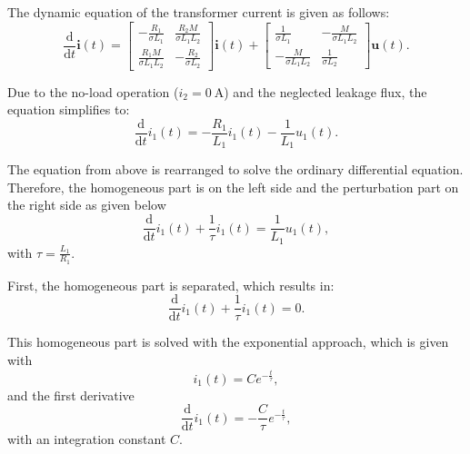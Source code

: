 \begin{solutionblock}
  
  The dynamic equation of the transformer current is given as follows:
  \begin{equation}
    \frac{\mathrm{d}}{\mathrm{d}t}\bm{i}(t) = \begin{bmatrix} -\frac{R_1}{\sigma L_1} & \frac{R_2 M}{\sigma L_1 L_2} \\ \frac{R_1 M}{\sigma L_1 L_2} & -\frac{R_2}{\sigma L_2} \end{bmatrix} \bm{i}(t) + \begin{bmatrix} \frac{1}{\sigma L_1} & -\frac{M}{\sigma L_1 L_2} \\ -\frac{M}{\sigma L_1 L_2} & \frac{1}{\sigma L_2} \end{bmatrix} \bm{u}(t).
  \end{equation}

  Due to the no-load operation ($i_{\mathrm{2}} = \SI{0}{\ampere}$) and the neglected leakage flux, the equation simplifies to:
  \begin{equation}
    \frac{\mathrm{d}}{\mathrm{d}t} i_{\mathrm{1}}(t) = -\frac{R_{\mathrm{1}}}{L_{\mathrm{1}}}i_{\mathrm{1}}(t) -\frac{1}{L_{\mathrm{1}}} u_{\mathrm{1}}(t).
  \end{equation}

  The equation from above is rearranged to solve the ordinary differential equation. Therefore, the homogeneous part is on the left side and the perturbation part on the right side as given below
  \begin{equation}
    \frac{\mathrm{d}}{\mathrm{d}t} i_{\mathrm{1}}(t) + \frac{1}{\tau} i_{\mathrm{1}}(t) = \frac{1}{L_{\mathrm{1}}} u_{\mathrm{1}}(t),
    \label{eq:ode}
  \end{equation}
  with $\tau = \frac{L_{\mathrm{1}}}{R_{\mathrm{1}}}$.
  
  First, the homogeneous part is separated, which results in:
  \begin{equation}
    \frac{\mathrm{d}}{\mathrm{d}t} i_{\mathrm{1}}(t) + \frac{1}{\tau} i_{\mathrm{1}}(t) = 0.
  \end{equation}

  This homogeneous part is solved with the exponential approach, which is given with
  \begin{equation}
    i_{\mathrm{1}}(t) = C e^{-\frac{t}{\tau}},
    \label{eq:ode_approach_hom}
  \end{equation}
  and the first derivative
  \begin{equation}
    \frac{\mathrm{d}}{\mathrm{d}t}i_{\mathrm{1}}(t) = -\frac{C}{\tau} e^{-\frac{t}{\tau}},
    \label{eq:ode_approach_hom_derivative}
  \end{equation}
  with an integration constant $C$.


\end{solutionblock}
